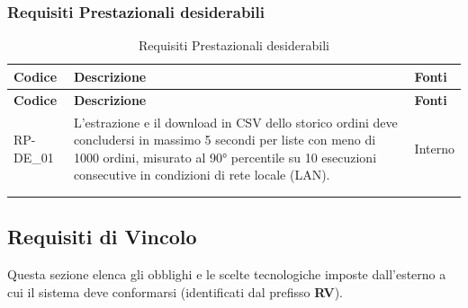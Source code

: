 \subsubsection{Requisiti Prestazionali desiderabili}
\renewcommand{\arraystretch}{1.15}
\begin{longtable}{|>{\raggedright}p{}|>{\raggedright\arraybackslash}p{}|>{\raggedright\arraybackslash}p{}|}

    \hline
    \rowcolor[gray]{0.9}
    \textbf{Codice} & \textbf{Descrizione} & \textbf{Fonti} \\
    \hline
    \endfirsthead
    
    \hline
    \rowcolor[gray]{0.9}
    \textbf{Codice} & \textbf{Descrizione} & \textbf{Fonti}  \\
    \hline
    \endhead

    \hline
    RP-DE\_01 \hypertarget{rp-de_1} & L'estrazione e il download in CSV dello storico ordini deve concludersi in massimo 5 secondi per liste con meno di 1000 ordini, misurato al 90° percentile su 10 esecuzioni consecutive in condizioni di rete locale (LAN). & Interno \\
    \hline
    \multicolumn{3}{c}{} \\
    \caption{Requisiti Prestazionali desiderabili}\hypertarget{tab:prestazionali_desiderabili}\\
\end{longtable}


\newpage
\subsection{Requisiti di Vincolo}
Questa sezione elenca gli obblighi e le scelte tecnologiche imposte dall'esterno a cui il sistema deve conformarsi (identificati dal prefisso \textbf{RV}).

